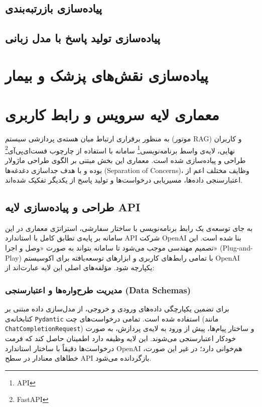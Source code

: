 \subsection{پیاده‌سازی بازرتبه‌بندی}
\subsection{پیاده‌سازی تولید پاسخ با مدل زبانی}
\section{پیاده‌سازی نقش‌های پزشک و بیمار}
\section{معماری لایه سرویس و رابط کاربری}

به منظور برقراری ارتباط میان هسته‌ی پردازشی سیستم (موتور RAG) و کاربران نهایی، لایه‌ی واسط برنامه‌نویسی\footnote{API} سامانه با استفاده از چارچوب فست‌ای‌پی‌آی\footnote{FastAPI} طراحی و پیاده‌سازی شده است. معماری این بخش مبتنی بر الگوی طراحی ماژولار بوده و با هدف جداسازی دغدغه‌ها (Separation of Concerns)، وظایف مختلف اعم از اعتبارسنجی داده‌ها، مسیریابی درخواست‌ها و تولید پاسخ از یکدیگر تفکیک شده‌اند.

\subsection{طراحی و پیاده‌سازی لایه API}

به جای توسعه‌ی یک رابط برنامه‌نویسی با ساختار سفارشی، استراتژی معماری در این سامانه بر پایه‌ی تطابق کامل با استاندارد API شرکت OpenAI بنا شده است. این تصمیم مهندسی موجب می‌شود تا سامانه بتواند به صورت «وصل و اجرا» (Plug-and-Play) با تمامی رابط‌های کاربری و ابزارهای توسعه‌یافته برای اکوسیستم OpenAI یکپارچه شود. مؤلفه‌های اصلی این لایه عبارت‌اند از:

\subsubsection{مدیریت طرح‌واره‌ها و اعتبارسنجی (Data Schemas)}

برای تضمین یکپارچگی داده‌های ورودی و خروجی، از مدل‌سازی داده مبتنی بر کتابخانه‌ی \texttt{Pydantic} استفاده شده است. تمامی درخواست‌های چت (مانند \texttt{ChatCompletionRequest}) و ساختار پیام‌ها، پیش از ورود به لایه‌ی پردازش، به صورت خودکار اعتبارسنجی می‌شوند. این لایه وظیفه دارد اطمینان حاصل کند که فرمت درخواست‌ها دقیقاً با ساختار استاندارد OpenAI هم‌خوانی دارد؛ در غیر این صورت، خطاهای معنادار در سطح API بازگردانده می‌شود.

